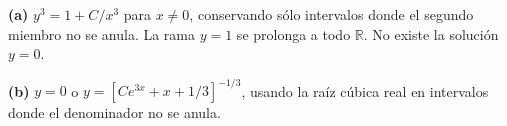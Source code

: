 \noindent\textbf{(a)} $y^3=1+C/x^3$ para $x\ne0$, conservando sólo intervalos donde el segundo miembro no se anula. La rama $y=1$ se prolonga a todo $\mathbb R$. No existe la solución $y=0$.

\noindent\textbf{(b)} $y=0$ o $y=[Ce^{3x}+x+1/3]^{-1/3}$, usando la raíz cúbica real en intervalos donde el denominador no se anula.

